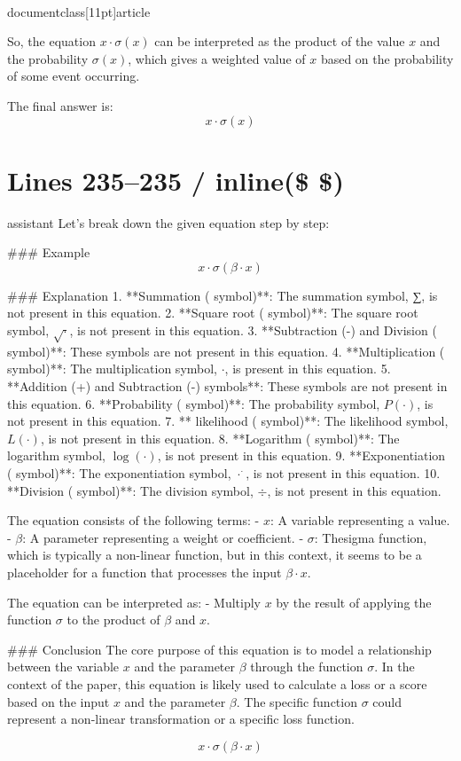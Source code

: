 \\documentclass[11pt]{article}
\begin{document}
So, the equation \( x \cdot \sigma(x) \) can be interpreted as the product of the value \( x \) and the probability \( \sigma(x) \), which gives a weighted value of \( x \) based on the probability of some event occurring.

The final answer is:
\[ \boxed{x \cdot \sigma(x)} \]


\section*{Lines 235–235 / inline(\$ \$) }
assistant
Let's break down the given equation step by step:

### Example
\[ x \cdot \sigma(\beta \cdot x) \]

### Explanation
1. **Summation ( symbol)**: The summation symbol, ∑, is not present in this equation.
2. **Square root ( symbol)**: The square root symbol, \(\sqrt{\cdot}\), is not present in this equation.
3. **Subtraction (-) and Division ( symbol)**: These symbols are not present in this equation.
4. **Multiplication ( symbol)**: The multiplication symbol, \(\cdot\), is present in this equation.
5. **Addition (+) and Subtraction (-) symbols**: These symbols are not present in this equation.
6. **Probability ( symbol)**: The probability symbol, \(P(\cdot)\), is not present in this equation.
7. ** likelihood ( symbol)**: The likelihood symbol, \(L(\cdot)\), is not present in this equation.
8. **Logarithm ( symbol)**: The logarithm symbol, \(\log(\cdot)\), is not present in this equation.
9. **Exponentiation ( symbol)**: The exponentiation symbol, \(\cdot^{\cdot}\), is not present in this equation.
10. **Division ( symbol)**: The division symbol, \(\div\), is not present in this equation.

The equation consists of the following terms:
- \(x\): A variable representing a value.
- \(\beta\): A parameter representing a weight or coefficient.
- \(\sigma\): Thesigma function, which is typically a non-linear function, but in this context, it seems to be a placeholder for a function that processes the input \(\beta \cdot x\).

The equation can be interpreted as:
- Multiply \(x\) by the result of applying the function \(\sigma\) to the product of \(\beta\) and \(x\).

### Conclusion
The core purpose of this equation is to model a relationship between the variable \(x\) and the parameter \(\beta\) through the function \(\sigma\). In the context of the paper, this equation is likely used to calculate a loss or a score based on the input \(x\) and the parameter \(\beta\). The specific function \(\sigma\) could represent a non-linear transformation or a specific loss function.

\[
\boxed{x \cdot \sigma(\beta \cdot x)}
\]
\end{document}
